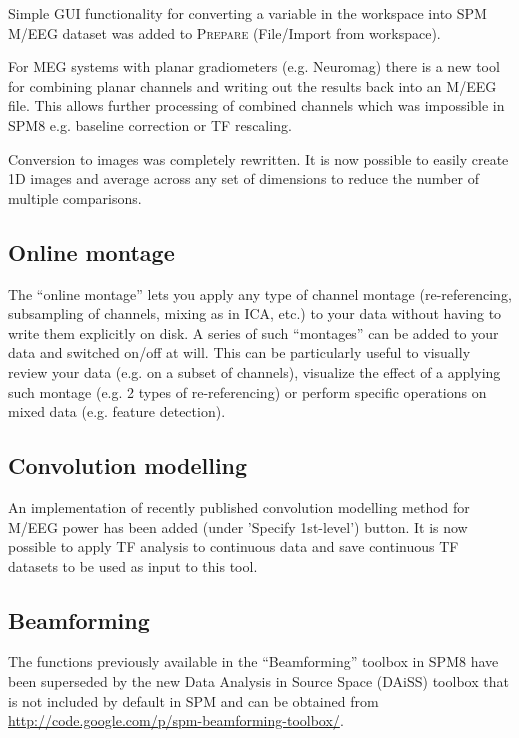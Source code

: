 \documentclass[a4paper,titlepage,openany]{article}
\begin{document}
Simple GUI functionality for converting a variable in the workspace into SPM M/EEG dataset was added to \textsc{Prepare} (File/Import from workspace).

For MEG systems with planar gradiometers (e.g. Neuromag) there is a new tool for combining planar channels and writing out the results back into an M/EEG file. This allows further processing of combined channels which was impossible in SPM8 e.g. baseline correction or TF rescaling.

Conversion to images was completely rewritten. It is now possible to easily create 1D images and average across any set of dimensions to reduce the number of multiple comparisons.

\subsection{Online montage}

The ``online montage'' lets you apply any type of channel montage (re-referencing, subsampling of channels, mixing as in ICA, etc.) to your data without having to write them explicitly on disk. A series of such ``montages'' can be added to your data and switched on/off at will. This can be particularly useful to visually review your data (e.g. on a subset of channels), visualize the effect of a applying such montage (e.g. 2 types of re-referencing) or perform specific operations on mixed data (e.g. feature detection).

\subsection{Convolution modelling}

An implementation of recently published convolution modelling method for M/EEG power \cite{Litvak_ConvModel_2013} has been added (under 'Specify 1st-level') button. It is now possible to apply TF analysis to continuous data and save continuous TF datasets to be used as input to this tool.

\subsection{Beamforming}

The functions previously available in the ``Beamforming'' toolbox in SPM8 have been superseded by the new Data Analysis in Source Space (DAiSS) toolbox that is not included by default in SPM and can be obtained from \url{http://code.google.com/p/spm-beamforming-toolbox/}.
\end{document}
